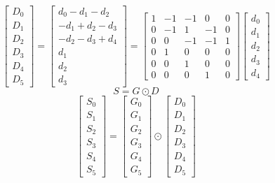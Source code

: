 \documentclass{article}%
\begin{document}
\[%
\left[\begin{matrix}D_{0}\\D_{1}\\D_{2}\\D_{3}\\D_{4}\\D_{5}\end{matrix}\right] = \left[\begin{matrix}d_{0} - d_{1} - d_{2}\\- d_{1} + d_{2} - d_{3}\\- d_{2} - d_{3} + d_{4}\\d_{1}\\d_{2}\\d_{3}\end{matrix}\right] = \left[\begin{matrix}1 & -1 & -1 & 0 & 0\\0 & -1 & 1 & -1 & 0\\0 & 0 & -1 & -1 & 1\\0 & 1 & 0 & 0 & 0\\0 & 0 & 1 & 0 & 0\\0 & 0 & 0 & 1 & 0\end{matrix}\right] \left[\begin{matrix}d_{0}\\d_{1}\\d_{2}\\d_{3}\\d_{4}\end{matrix}\right]%
\]%
\[%
S = G \odot D%
\]%
\[%
\left[\begin{matrix}S_{0}\\S_{1}\\S_{2}\\S_{3}\\S_{4}\\S_{5}\end{matrix}\right] = \left[\begin{matrix}G_{0}\\G_{1}\\G_{2}\\G_{3}\\G_{4}\\G_{5}\end{matrix}\right] \odot \left[\begin{matrix}D_{0}\\D_{1}\\D_{2}\\D_{3}\\D_{4}\\D_{5}\end{matrix}\right]%
\]%
\end{document}
